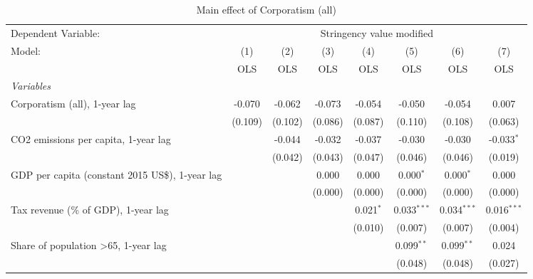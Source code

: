 
\begin{table}[htbp]
   \caption{Main effect of Corporatism (all)}
   \centering
   \begin{tabular}{lccccccc}
      \toprule
      Dependent Variable: & \multicolumn{7}{c}{Stringency value modified}\\
      Model:                                                & (1)     & (2)     & (3)     & (4)         & (5)           & (6)           & (7)\\  
                                                            &  OLS    & OLS     & OLS     & OLS         & OLS           & OLS           & OLS\\  
      \midrule
      \emph{Variables}\\
      Corporatism (all), 1-year lag                         & -0.070  & -0.062  & -0.073  & -0.054      & -0.050        & -0.054        & 0.007\\   
                                                            & (0.109) & (0.102) & (0.086) & (0.087)     & (0.110)       & (0.108)       & (0.063)\\   
      CO2 emissions per capita, 1-year lag                  &         & -0.044  & -0.032  & -0.037      & -0.030        & -0.030        & -0.033$^{*}$\\   
                                                            &         & (0.042) & (0.043) & (0.047)     & (0.046)       & (0.046)       & (0.019)\\   
      GDP per capita (constant 2015 US\$), 1-year lag       &         &         & 0.000   & 0.000       & 0.000$^{*}$   & 0.000$^{*}$   & 0.000\\   
                                                            &         &         & (0.000) & (0.000)     & (0.000)       & (0.000)       & (0.000)\\   
      Tax revenue (\% of GDP), 1-year lag                   &         &         &         & 0.021$^{*}$ & 0.033$^{***}$ & 0.034$^{***}$ & 0.016$^{***}$\\   
                                                            &         &         &         & (0.010)     & (0.007)       & (0.007)       & (0.004)\\   
      Share of population >65, 1-year lag                   &         &         &         &             & 0.099$^{**}$  & 0.099$^{**}$  & 0.024\\   
                                                            &         &         &         &             & (0.048)       & (0.048)       & (0.027)\\   

\end{tabular}
\end{table}
